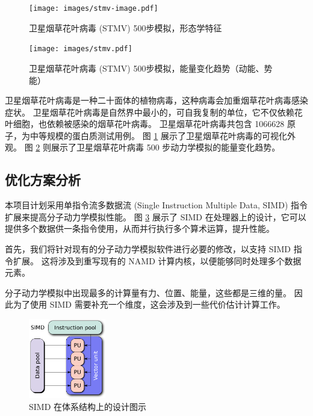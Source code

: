 \begin{figure}[H]
    \centering
    \texttt{[image: images/stmv-image.pdf]}
    \caption{卫星烟草花叶病毒 (STMV) 500步模拟，形态学特征}
    \label{fig:stmv}
\end{figure}

\begin{figure}[H]
    \centering
    \texttt{[image: images/stmv.pdf]}
    \caption{卫星烟草花叶病毒 (STMV) 500步模拟，能量变化趋势（动能、势能）}
    \label{fig:stmv-plot}
\end{figure}

卫星烟草花叶病毒是一种二十面体的植物病毒，这种病毒会加重烟草花叶病毒感染症状。
卫星烟草花叶病毒是自然界中最小的，可自我复制的单位，它不仅依赖花叶细胞，也依赖被感染的烟草花叶病毒。
卫星烟草花叶病毒共包含 1066628 原子，为中等规模的蛋白质测试用例。
图 \ref{fig:stmv} 展示了卫星烟草花叶病毒的可视化外观。
图 \ref{fig:stmv-plot} 则展示了卫星烟草花叶病毒 500 步动力学模拟的能量变化趋势。






\subsection{优化方案分析}

本项目计划采用单指令流多数据流 (Single Instruction Multiple Data, SIMD) 指令扩展来提高分子动力学模拟性能。
图 \ref{fig:simd} 展示了 SIMD 在处理器上的设计，它可以提供多个数据供一条指令使用，从而并行执行多个算术运算，提升性能。


首先，我们将针对现有的分子动力学模拟软件进行必要的修改，以支持 SIMD 指令扩展。
这将涉及到重写现有的 NAMD 计算内核，以便能够同时处理多个数据元素。

分子动力学模拟中出现最多的计算量有力、位置、能量，这些都是三维的量。
因此为了使用 SIMD 需要补充一个维度，这会涉及到一些代价估计计算工作。


\begin{figure}[H]
    \centering
    \includegraphics[width=0.3\textwidth]{images/SIMD2.svg.png}
    \caption{SIMD 在体系结构上的设计图示}
    \label{fig:simd}
\end{figure}

